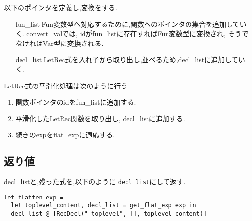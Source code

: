 以下のポインタを定義し,変換をする.

\begin{itemize}

\item[fun\_list]
Fun変数型へ対応するために,関数へのポインタの集合を追加していく. convert\_valでは, idがfun\_listに存在すればFun変数型に変換され, そうでなければVar型に変換される.

\item[decl\_list]
LetRec式を入れ子から取り出し,並べるため,decl\_listに追加していく.
\end{itemize}

LetRec式の平滑化処理は次のように行う.

\begin{enumerate}

\item 関数ポインタのidをfun\_listに追加する.
\item 平滑化したLetRec関数を取り出し, decl\_listに追加する.
\item 続きのexpをflat\_expに適応する.
\end{enumerate}

\subsection*{返り値}

decl\_listと,残った式を,以下のように \lstinline{decl list}にして返す.

\begin{lstlisting}
let flatten exp = 
  let toplevel_content, decl_list = get_flat_exp exp in
  decl_list @ [RecDecl("_toplevel", [], toplevel_content)]
\end{lstlisting}

